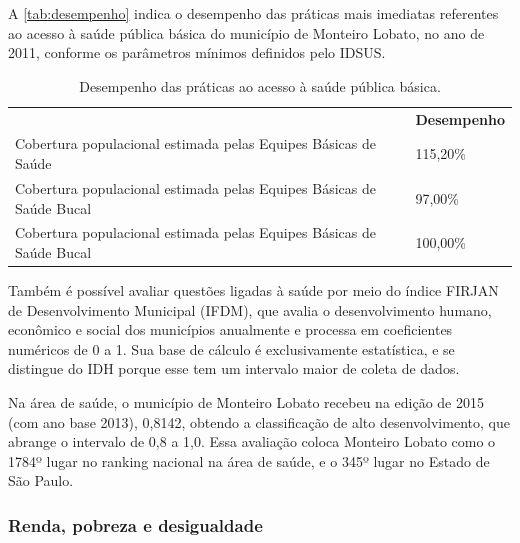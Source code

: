 A \autoref{tab:desempenho} indica o desempenho das práticas mais imediatas referentes ao acesso à saúde pública básica do município de Monteiro Lobato, no ano de 2011, conforme os parâmetros mínimos definidos pelo IDSUS.

\begin{table}[htbp]
	\centering
	\caption{Desempenho das práticas ao acesso à saúde pública básica.}
	\begin{tabular}{P{0.5\textwidth}|P{0.15\textwidth}}
		 & \textcolor[rgb]{ 1,  1,  1}{\textbf{Desempenho}} \\
		 Cobertura populacional estimada pelas Equipes Básicas de Saúde & 115,20\% \\
		 Cobertura populacional estimada pelas Equipes Básicas de Saúde Bucal & 97,00\% \\
		 Cobertura populacional estimada pelas Equipes Básicas de Saúde Bucal & 100,00\% \\
	\end{tabular}%
	\label{tab:desempenho}%
\end{table}%

Também é possível avaliar questões ligadas à saúde por meio do índice FIRJAN de Desenvolvimento Municipal (IFDM), que avalia o desenvolvimento humano, econômico e social dos municípios anualmente e processa em coeficientes numéricos de 0 a 1. Sua base de cálculo é exclusivamente estatística, e se distingue do IDH porque esse tem um intervalo maior de coleta de dados. 		

Na área de saúde, o município de Monteiro Lobato recebeu na edição de 2015 (com ano base 2013), 0,8142, obtendo a classificação de alto desenvolvimento, que abrange o intervalo de 0,8 a 1,0. Essa avaliação coloca Monteiro Lobato como o 1784º lugar no ranking nacional na área de saúde, e o 345º lugar no Estado de São Paulo.

\subsubsection{Renda, pobreza e desigualdade}

